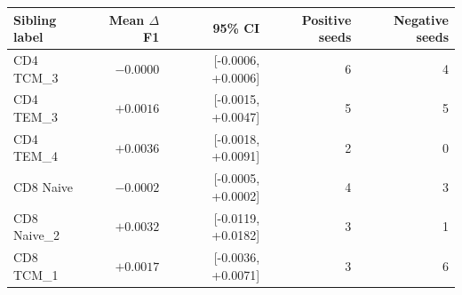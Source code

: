 \begin{tabular}{lrrrr}
\toprule
Sibling label & Mean $\Delta$F1 & 95\% CI & Positive seeds & Negative seeds \\
\midrule
CD4 TCM\_3 & $-0.0000$ & [-0.0006, +0.0006] & 6 & 4 \\
CD4 TEM\_3 & $+0.0016$ & [-0.0015, +0.0047] & 5 & 5 \\
CD4 TEM\_4 & $+0.0036$ & [-0.0018, +0.0091] & 2 & 0 \\
CD8 Naive & $-0.0002$ & [-0.0005, +0.0002] & 4 & 3 \\
CD8 Naive\_2 & $+0.0032$ & [-0.0119, +0.0182] & 3 & 1 \\
CD8 TCM\_1 & $+0.0017$ & [-0.0036, +0.0071] & 3 & 6 \\
\bottomrule
\end{tabular}
